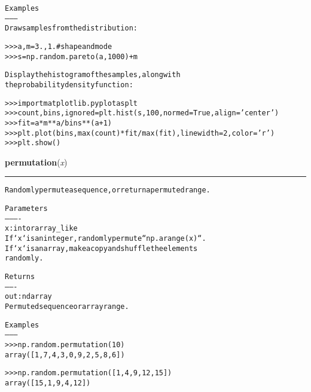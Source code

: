 \begin{boxedminipage}{\funcwidth}
\begin{alltt}
Examples
--------
Draw samples from the distribution:

{\textgreater}{\textgreater}{\textgreater} a, m = 3., 1. \# shape and mode
{\textgreater}{\textgreater}{\textgreater} s = np.random.pareto(a, 1000) + m

Display the histogram of the samples, along with
the probability density function:

{\textgreater}{\textgreater}{\textgreater} import matplotlib.pyplot as plt
{\textgreater}{\textgreater}{\textgreater} count, bins, ignored = plt.hist(s, 100, normed=True, align='center')
{\textgreater}{\textgreater}{\textgreater} fit = a*m**a/bins**(a+1)
{\textgreater}{\textgreater}{\textgreater} plt.plot(bins, max(count)*fit/max(fit),linewidth=2, color='r')
{\textgreater}{\textgreater}{\textgreater} plt.show()
\end{alltt}

\setlength{\parskip}{1ex}
    \end{boxedminipage}

    \label{trunk:qstkutil:bollinger:permutation}

    \vspace{0.5ex}

\hspace{.8\funcindent}\begin{boxedminipage}{\funcwidth}

    \raggedright \textbf{permutation}(\textit{x})

    \vspace{-1.5ex}

    \rule{\textwidth}{0.5\fboxrule}
\setlength{\parskip}{2ex}
\begin{alltt}
Randomly permute a sequence, or return a permuted range.

Parameters
----------
x : int or array\_like
    If `x` is an integer, randomly permute ``np.arange(x)``.
    If `x` is an array, make a copy and shuffle the elements
    randomly.

Returns
-------
out : ndarray
    Permuted sequence or array range.

Examples
--------
{\textgreater}{\textgreater}{\textgreater} np.random.permutation(10)
array([1, 7, 4, 3, 0, 9, 2, 5, 8, 6])

{\textgreater}{\textgreater}{\textgreater} np.random.permutation([1, 4, 9, 12, 15])
array([15,  1,  9,  4, 12])
\end{alltt}

\setlength{\parskip}{1ex}
    \end{boxedminipage}

